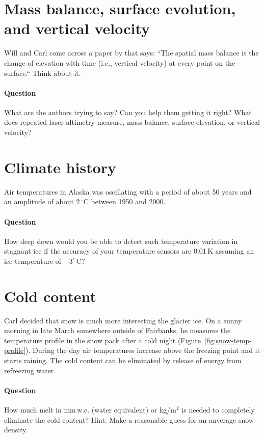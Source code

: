 \documentclass[parskip=half]{scrartcl}
\newcommand{\cels}[1]{\ensuremath{#1^{\circ}\,\mathrm{C}}}
\begin{document}
\section{Mass balance, surface evolution, and vertical velocity}

Will and Carl come across a paper by \cite{Konrad1999} that says: ``The spatial mass balance is the change of elevation with time (i.e., vertical velocity) at every point on the surface.`` Think about it. 

\paragraph{Question} What are the authors trying to say? Can you help them getting it right? What does repeated laser altimetry measure, mass balance, surface elevation, or vertical velocity?

\section{Climate history}

Air temperatures in Alaska was oscillating with a period of about 50 years and an amplitude of about 2$\,^\circ\text{C}$ between 1950 and 2000. 

\paragraph{Question} How deep down would you be able to detect such temperature variation in stagnant ice if the accuracy of your temperature sensors are 0.01$\,\text{K}$ assuming an ice temperature of $-\cels{3}$?

\section{Cold content}

Carl decided that snow is much more interesting the glacier ice. On a sunny morning in late March somewhere outside of Fairbanks, he measures the temperature profile in the snow pack after a cold night (Figure~\ref{fig:snow-temp-profile}). During the day air temperatures increase above the freezing point and it starts raining. The cold content can be eliminated by release of energy from refreezing water. 

\paragraph{Question} How much melt in mm\,w.e. (water equivalent) or kg/m$^{2}$ is needed to completely eliminate the cold content? Hint: Make a reasonable guess for an anverage snow density.
\end{document}
